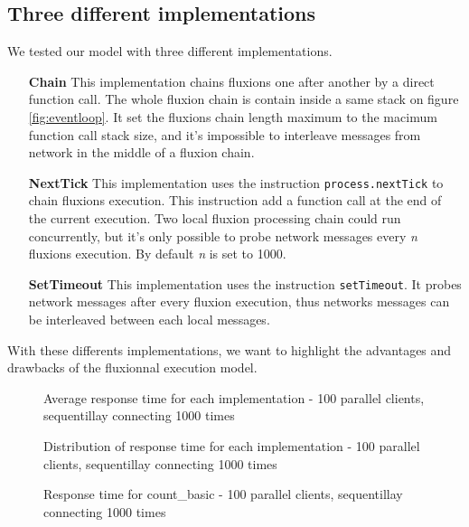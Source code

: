 \subsection{Three different implementations}

We tested our model with three different implementations.

\begin{itemize}
	\item[\textbf{Chain}]
		This implementation chains fluxions one after another by a direct function call.
		The whole fluxion chain is contain inside a same stack on figure \ref{fig:eventloop}.
		It set the fluxions chain length maximum to the macimum function call stack size, and it's impossible to interleave messages from network in the middle of a fluxion chain.

	\item[\textbf{NextTick}]
		This implementation uses the instruction \texttt{process.nextTick} to chain fluxions execution.
		This instruction add a function call at the end of the current execution.
		Two local fluxion processing chain could run concurrently, but it's only possible to probe network messages every \textit{n} fluxions execution.
		By default \textit{n} is set to 1000.

	\item[\textbf{SetTimeout}]
		This implementation uses the instruction \texttt{setTimeout}.
		It probes network messages after every fluxion execution, thus networks messages can be interleaved between each local messages.
\end{itemize}

With these differents implementations, we want to highlight the advantages and drawbacks of the fluxionnal execution model.

\begin{figure}

\caption{Average response time for each implementation - 100 parallel clients, sequentillay connecting 1000 times}
\label{fig:reponsetime}
\end{figure}

\begin{figure}

\caption{Distribution of response time for each implementation - 100 parallel clients, sequentillay connecting 1000 times}
\label{fig:distribution}
\end{figure}

\begin{figure}

\caption{Response time for count\_basic - 100 parallel clients, sequentillay connecting 1000 times}
\label{fig:timecountbasic}
\end{figure}


